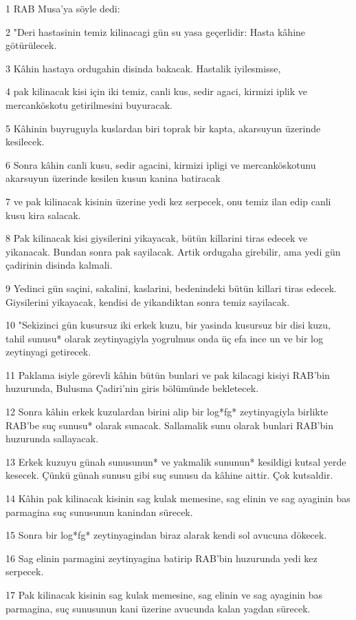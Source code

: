 \par 1 RAB Musa'ya söyle dedi:
\par 2 "Deri hastasinin temiz kilinacagi gün su yasa geçerlidir: Hasta kâhine götürülecek.
\par 3 Kâhin hastaya ordugahin disinda bakacak. Hastalik iyilesmisse,
\par 4 pak kilinacak kisi için iki temiz, canli kus, sedir agaci, kirmizi iplik ve mercanköskotu getirilmesini buyuracak.
\par 5 Kâhinin buyruguyla kuslardan biri toprak bir kapta, akarsuyun üzerinde kesilecek.
\par 6 Sonra kâhin canli kusu, sedir agacini, kirmizi ipligi ve mercanköskotunu akarsuyun üzerinde kesilen kusun kanina batiracak
\par 7 ve pak kilinacak kisinin üzerine yedi kez serpecek, onu temiz ilan edip canli kusu kira salacak.
\par 8 Pak kilinacak kisi giysilerini yikayacak, bütün killarini tiras edecek ve yikanacak. Bundan sonra pak sayilacak. Artik ordugaha girebilir, ama yedi gün çadirinin disinda kalmali.
\par 9 Yedinci gün saçini, sakalini, kaslarini, bedenindeki bütün killari tiras edecek. Giysilerini yikayacak, kendisi de yikandiktan sonra temiz sayilacak.
\par 10 "Sekizinci gün kusursuz iki erkek kuzu, bir yasinda kusursuz bir disi kuzu, tahil sunusu* olarak zeytinyagiyla yogrulmus onda üç efa ince un ve bir log zeytinyagi getirecek.
\par 11 Paklama isiyle görevli kâhin bütün bunlari ve pak kilacagi kisiyi RAB'bin huzurunda, Bulusma Çadiri'nin giris bölümünde bekletecek.
\par 12 Sonra kâhin erkek kuzulardan birini alip bir log*fg* zeytinyagiyla birlikte RAB'be suç sunusu* olarak sunacak. Sallamalik sunu olarak bunlari RAB'bin huzurunda sallayacak.
\par 13 Erkek kuzuyu günah sunusunun* ve yakmalik sununun* kesildigi kutsal yerde kesecek. Çünkü günah sunusu gibi suç sunusu da kâhine aittir. Çok kutsaldir.
\par 14 Kâhin pak kilinacak kisinin sag kulak memesine, sag elinin ve sag ayaginin bas parmagina suç sunusunun kanindan sürecek.
\par 15 Sonra bir log*fg* zeytinyagindan biraz alarak kendi sol avucuna dökecek.
\par 16 Sag elinin parmagini zeytinyagina batirip RAB'bin huzurunda yedi kez serpecek.
\par 17 Pak kilinacak kisinin sag kulak memesine, sag elinin ve sag ayaginin bas parmagina, suç sunusunun kani üzerine avucunda kalan yagdan sürecek.
